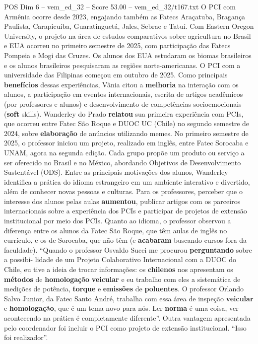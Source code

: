 \begin{textsample}{POS Dim 6 – vem\_ed\_32 – Score 53.00 – vem\_ed\_32/t167.txt}
O PCI com Armênia ocorre desde 2023, engajando também as Fatecs Araçatuba, Bragança Paulista, Carapicuíba, Guaratinguetá, Jales, Sebrae e Tatuí.
Com Eastern Oregon University, o projeto na área de estudos comparativos sobre agricultura no Brasil e EUA ocorreu no primeiro semestre de 2025, com participação das Fatecs Pompeia e Mogi das Cruzes.
Os alunos dos EUA estudaram os biomas brasileiros e os alunos brasileiros pesquisaram as regiões norte-americanas.
O PCI com a universidade das Filipinas começou em outubro de 2025.
Como principais \textbf{benefícios} dessas experiências, Vânia citou a \textbf{melhoria} na interação com os alunos, a participação em eventos internacionais, escrita de artigos acadêmicos (por professores e alunos) e desenvolvimento de competências socioemocionais (\textbf{soft} skills).
Wanderley do Prado \textbf{relatou} sua primeira experiência com PCIs, que ocorreu entre Fatec São Roque e DUOC UC (Chile) no segundo semestre de 2024, sobre \textbf{elaboração} de anúncios utilizando memes.
No primeiro semestre de 2025, o professor iniciou um projeto, realizado em inglês, entre Fatec Sorocaba e UNAM, agora na segunda edição.
Cada grupo propõe um produto ou serviço a ser oferecido no Brasil e no México, abordando Objetivos de Desenvolvimento Sustentável (ODS).
Entre as principais motivações dos alunos, Wanderley identifica a prática do idioma estrangeiro em um ambiente interativo e divertido, além de conhecer novas pessoas e culturas.
Para os professores, perceber que o interesse dos alunos pelas aulas \textbf{aumentou}, publicar artigos com os parceiros internacionais sobre a experiência dos PCIs e participar de projetos de extensão institucional por meio dos PCIs.
Quanto ao idioma, o professor observou a diferença entre os alunos da Fatec São Roque, que têm aulas de inglês no currículo, e os de Sorocaba, que não têm (e \textbf{acabaram} buscando cursos fora da faculdade). “Quando o professor Osvaldo Succi me procurou \textbf{perguntando} sobre a possibi- lidade de um Projeto Colaborativo Internacional com a DUOC do Chile, eu tive a ideia de trocar informações: os \textbf{chilenos} nos apresentam os \textbf{métodos} de \textbf{homologação} \textbf{veicular} e eu trabalho com eles a sistemática de medições de potência, \textbf{torque} e \textbf{emissões} de \textbf{poluentes}.
O professor Orlando Salvo Junior, da Fatec Santo André, trabalha com essa área de inspeção \textbf{veicular} e \textbf{homologação}, que é um tema novo para nós.
Ler \textbf{norma} é uma coisa, ver acontecendo na prática é completamente diferente”.
Outra vantagem apresentada pelo coordenador foi incluir o PCI como projeto de extensão institucional. “Isso foi realizador”.

\end{textsample}
